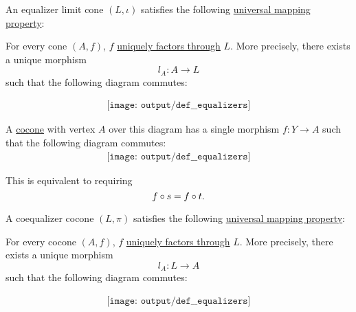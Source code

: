 \begin{definition}
\begin{minipage}[t]{0.47\textwidth}
    An equalizer limit cone \( (L, \iota) \) satisfies the following \hyperref[rem:limit_universal_mapping_property]{universal mapping property}:
    \begin{displayquote}
      For every cone \( (A, f) \), \( f \) \hyperref[def:factors_through]{uniquely factors through} \( L \). More precisely, there exists a unique morphism
      \begin{equation*}
         l_A: A \to L
      \end{equation*}
      such that the following diagram commutes:
    \end{displayquote}
    \begin{equation}\label{eq:def:equalizers/equalizer}
      \begin{aligned}
        \texttt{[image: output/def\_\_equalizers]}
      \end{aligned}
    \end{equation}
  \end{minipage}
  \hfill
  \begin{minipage}[t]{0.47\textwidth}
    A \hyperref[def:category_of_cones/cocone]{cocone} with vertex \( A \) over this diagram has a single morphism \( f: Y \to A \) such that the following diagram commutes:
    \begin{equation}\label{eq:def:equalizers/cocone}
      \begin{aligned}
        \texttt{[image: output/def\_\_equalizers]}
      \end{aligned}
    \end{equation}

    This is equivalent to requiring
    \begin{equation*}
      f \bincirc s = f \bincirc t.
    \end{equation*}

    A coequalizer cocone \( (L, \pi) \) satisfies the following \hyperref[rem:limit_universal_mapping_property]{universal mapping property}:
    \begin{displayquote}
      For every cocone \( (A, f) \), \( f \) \hyperref[def:factors_through]{uniquely factors through} \( L \). More precisely, there exists a unique morphism
      \begin{equation*}
        l_A: L \to A
      \end{equation*}
      such that the following diagram commutes:
    \end{displayquote}
    \begin{equation}\label{eq:def:equalizers/coequalizer}
      \begin{aligned}
        \texttt{[image: output/def\_\_equalizers]}
      \end{aligned}
    \end{equation}
  \end{minipage}


\end{definition}

